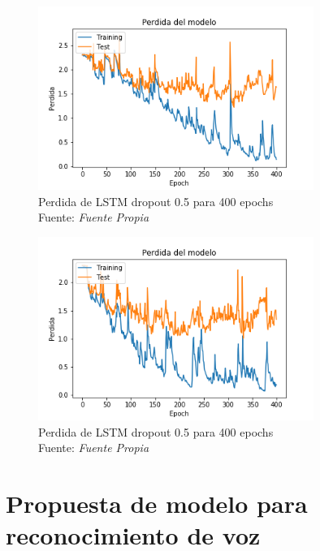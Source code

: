 \begin{figure}[H]
	\centering
	\includegraphics[width=0.8\textwidth]{Figures/lstm_400drop05_cost_13mfcc}
	\caption{Perdida de LSTM dropout 0.5 para 400 epochs\\ Fuente: {\textit{Fuente Propia}}}
	\label{LSTMdropout5cost}
\end{figure} 


\begin{figure}[H]
	\centering
	\includegraphics[width=0.8\textwidth]{Figures/lstm_400drop08_cost_13mfcc}
	\caption{Perdida de LSTM dropout 0.5 para 400 epochs\\ Fuente: {\textit{Fuente Propia}}}
	\label{LSTMdropout8cost}
\end{figure} 

\section{Propuesta de modelo para reconocimiento de voz}